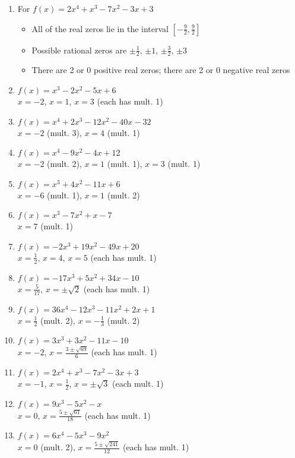 \begin{enumerate}
\item For   $f(x) = 2x^4+x^3-7x^2-3x+3$
\begin{itemize}
\item  All of the real zeros lie in the interval $\left[-\frac{9}{2},\frac{9}{2}\right]$
\item  Possible rational zeros are  $\pm \frac{1}{2}$, $\pm 1$,  $\pm \frac{3}{2}$, $\pm 3$
\item  There are 2 or 0 positive real zeros;  there are 2 or 0 negative real zeros
\end{itemize}


\item $f(x) = x^{3} - 2x^{2} - 5x + 6$ \\ $x = -2$, $x = 1$, $x = 3$ (each has mult. 1)
\item $f(x) = x^{4} + 2x^{3} - 12x^{2} - 40x - 32$ \\ $x = -2$ (mult. 3), $x = 4$ (mult. 1)


\item $f(x) = x^{4} - 9x^{2} - 4x + 12$ \\ $x = -2$ (mult. 2), $x = 1$ (mult. 1), $x = 3$ (mult. 1)
\item $f(x) = x^{3} + 4x^{2} - 11x + 6$ \\ $x = -6$ (mult. 1), $x = 1$ (mult. 2)

\item $f(x) = x^{3} - 7x^{2} + x - 7$ \\ $x = 7$ (mult. 1)
\item $f(x) = -2x^{3} + 19x^{2} - 49x + 20$ \\ $x = \frac{1}{2}$, $x = 4$, $x = 5$ (each has mult. 1)

\item $f(x) = -17x^{3} + 5x^{2} + 34x - 10$ \\ $x = \frac{5}{17}$, $x = \pm \sqrt{2}$ (each has mult. 1)
\item $f(x) = 36x^{4} - 12x^{3} - 11x^{2} + 2x + 1$ \\ $x = \frac{1}{2}$ (mult. 2), $x = -\frac{1}{3}$ (mult. 2)

\item $f(x) = 3x^{3} + 3x^{2} - 11x - 10$ \\ $x = -2$, $x = \frac{3 \pm \sqrt{69}}{6}$ (each has mult. 1)
\item $f(x) = 2x^4+x^3-7x^2-3x+3$ \\ $x = -1$, $x = \frac{1}{2}$, $x=\pm \sqrt{3}$ (each mult. 1)

\item $f(x) = 9x^{3} - 5x^{2} - x$ \\ $x = 0$, $x = \frac{5 \pm \sqrt{61}}{18}$ (each has mult. 1)
\item $f(x) = 6x^{4} - 5x^{3} - 9x^{2}$ \\ $x = 0$ (mult. 2), $x = \frac{5 \pm \sqrt{241}}{12}$ (each has mult. 1)


\end{enumerate}
